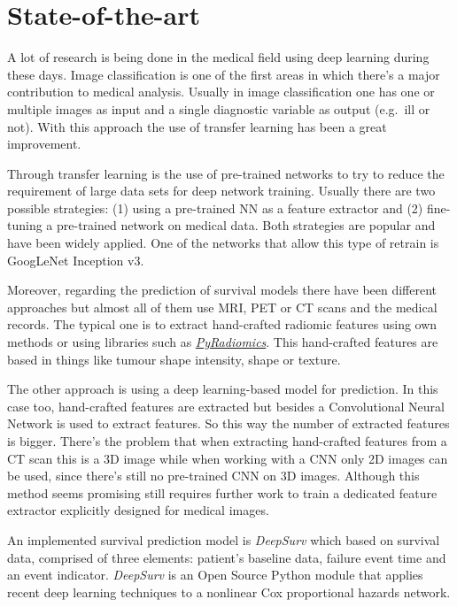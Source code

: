 \section{State-of-the-art}

A lot of research is being done in the medical field using deep learning during these days. Image
classification is one of the first areas in which there's a major contribution to medical analysis.
Usually in image classification one has one or multiple images as input and a single diagnostic 
variable as output (e.g.~ill or not). With this approach the use of transfer learning has been a
great improvement.
~\cite{survey-deep-learning}

Through transfer learning is the use of pre-trained networks to try to reduce the requirement of 
large data sets for deep network training. Usually there are two possible strategies: (1) using a 
pre-trained NN as a feature extractor and (2) fine-tuning a pre-trained network on medical data.
Both strategies are popular and have been widely applied. One of the networks that allow this type
of retrain is GoogLeNet Inception v3.
~\cites{GoogLeNet}{NNRetrain}{inceptionRetrain}

Moreover, regarding the prediction of survival models there have been different approaches but
almost all of them use MRI, PET or CT scans and the medical records. The typical one is to extract
hand-crafted radiomic features using own methods or using libraries such as
\href{https://github.com/Radiomics/pyradiomics}{\emph{PyRadiomics}}. This hand-crafted features are
based in things like tumour shape intensity, shape or texture.
~\cites{PyRadiomics}{tumour-radiomics}

The other approach is using a deep learning-based model for prediction. In this case too, 
hand-crafted features are extracted but besides a Convolutional Neural Network is used to extract
features. So this way the number of extracted features is bigger. There's the problem that when
extracting hand-crafted features from a CT scan this is a 3D image while when working with a 
CNN only 2D images can be used, since there's still no pre-trained CNN on 3D images. Although
this method seems promising still requires further work to train a dedicated feature extractor 
explicitly designed for medical images.
~\cite{deep-learning-radiomics-gbm}

An implemented survival prediction model is \emph{DeepSurv} which based on survival data,
comprised of three elements: patient's baseline data, failure event time and an event indicator.
\emph{DeepSurv} is an Open Source Python module that applies recent deep learning techniques to
a nonlinear Cox proportional hazards network. 
~\cite{DeepSurv}

